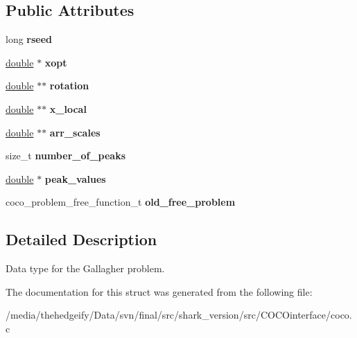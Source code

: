 \subsection*{Public Attributes}
\begin{DoxyCompactItemize}
\item 
long {\bfseries rseed}\hypertarget{structf__gallagher__data__t_a5eb7468baf0f19371bcd549d0371864c}{}\label{structf__gallagher__data__t_a5eb7468baf0f19371bcd549d0371864c}

\item 
\hyperlink{classdouble}{double} $\ast$ {\bfseries xopt}\hypertarget{structf__gallagher__data__t_a780e9a8ff127353efc9fdf49a87ed89b}{}\label{structf__gallagher__data__t_a780e9a8ff127353efc9fdf49a87ed89b}

\item 
\hyperlink{classdouble}{double} $\ast$$\ast$ {\bfseries rotation}\hypertarget{structf__gallagher__data__t_ad39253f9b4fa187c562e8ab6771132b0}{}\label{structf__gallagher__data__t_ad39253f9b4fa187c562e8ab6771132b0}

\item 
\hyperlink{classdouble}{double} $\ast$$\ast$ {\bfseries x\+\_\+local}\hypertarget{structf__gallagher__data__t_aea5e414c9924ca6942d31e724f2e91a3}{}\label{structf__gallagher__data__t_aea5e414c9924ca6942d31e724f2e91a3}

\item 
\hyperlink{classdouble}{double} $\ast$$\ast$ {\bfseries arr\+\_\+scales}\hypertarget{structf__gallagher__data__t_a292fdf60bed4f1f95bb75754f9fe2834}{}\label{structf__gallagher__data__t_a292fdf60bed4f1f95bb75754f9fe2834}

\item 
size\+\_\+t {\bfseries number\+\_\+of\+\_\+peaks}\hypertarget{structf__gallagher__data__t_a263a1af38194e947323e8302389240cc}{}\label{structf__gallagher__data__t_a263a1af38194e947323e8302389240cc}

\item 
\hyperlink{classdouble}{double} $\ast$ {\bfseries peak\+\_\+values}\hypertarget{structf__gallagher__data__t_a0767b3d74a74bc3454c1505387b5cbdf}{}\label{structf__gallagher__data__t_a0767b3d74a74bc3454c1505387b5cbdf}

\item 
coco\+\_\+problem\+\_\+free\+\_\+function\+\_\+t {\bfseries old\+\_\+free\+\_\+problem}\hypertarget{structf__gallagher__data__t_a9aef33367fcc08bcb3da441c1a59b9f0}{}\label{structf__gallagher__data__t_a9aef33367fcc08bcb3da441c1a59b9f0}

\end{DoxyCompactItemize}


\subsection{Detailed Description}
Data type for the Gallagher problem. 

The documentation for this struct was generated from the following file\+:\begin{DoxyCompactItemize}
\item 
/media/thehedgeify/\+Data/svn/final/src/shark\+\_\+version/src/\+C\+O\+C\+Ointerface/coco.\+c\end{DoxyCompactItemize}
